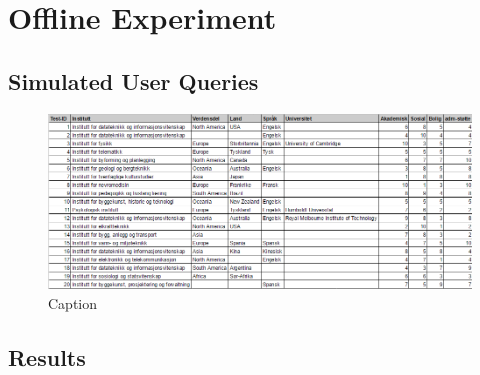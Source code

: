 \chapter{Offline Experiment}

\section{Simulated User Queries}
\label{app:user_queries}

\begin{figure}[h]
    \centering
    \includegraphics[width=1.0\textwidth]{fig/simulated_queries.PNG}
    \caption[]{Caption}
    \label{fig:my_label}
\end{figure}


\section{Results}

